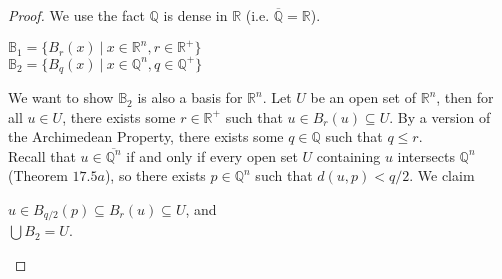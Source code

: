 \documentclass[11pt]{article}
\theoremstyle{definition}
\theoremstyle{theorem}
\begin{document}
\begin{proof} We use the fact $\mathbb{Q}$ is dense in $\mathbb{R}$ (i.e. $\overline{\mathbb{Q}} = \mathbb{R}$).

\begin{center}
    $\mathbb{B}_1 = \{B_r(x) \ | \ x \in \mathbb{R}^n, r \in \mathbb{R}^+\}$\\
    $\mathbb{B}_2 = \{B_q(x) \ | \ x \in \mathbb{Q}^n, q \in \mathbb{Q}^+\}$
\end{center}

\noindent We want to show $\mathbb{B}_2$ is also a basis for $\mathbb{R}^n$. Let $U$ be an open set of $\mathbb{R}^n$, then for all $u \in U$, there exists some $r \in \mathbb{R}^+$ such that $u \in B_r(u) \subseteq
U$. By a version of the Archimedean Property, there exists some $q \in \mathbb{Q}$ such that $q \leq r$. \\

\noindent Recall that $u \in \overline{\mathbb{Q}^n}$ if and only if every open set $U$ containing $u$ intersects $\mathbb{Q}^n$ (Theorem $17.5a$), so there exists $p \in \mathbb{Q}^n$ such that $d(u,p)<q/2$. We claim

\begin{center}
    $u \in B_{q/2} (p) \subseteq B_r(u) \subseteq U$, and\\
    $\displaystyle \bigcup B_{2} = U$.
\end{center}

\end{proof}
\end{document}
